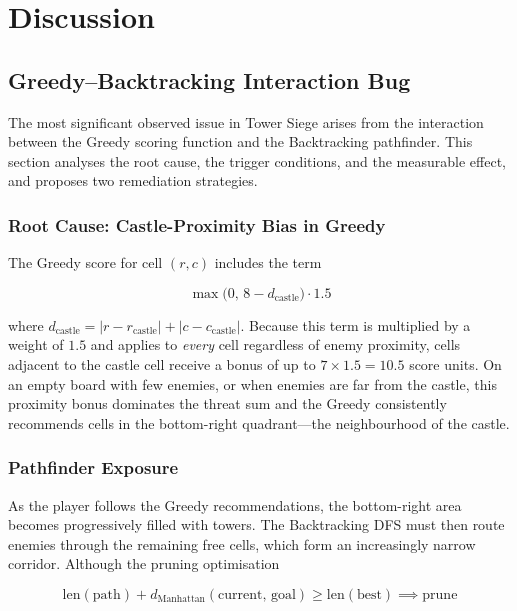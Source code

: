 \documentclass[12pt,a4paper]{report}
\begin{document}
\chapter{Discussion}
\label{ch:discussion}

\section{Greedy–Backtracking Interaction Bug}

The most significant observed issue in Tower Siege arises from the interaction
between the Greedy scoring function and the Backtracking pathfinder.
This section analyses the root cause, the trigger conditions, and the
measurable effect, and proposes two remediation strategies.

\subsection{Root Cause: Castle-Proximity Bias in Greedy}

The Greedy score for cell $(r, c)$ includes the term

\[
  \max\!\bigl(0,\,8 - d_\text{castle}\bigr) \cdot 1.5
\]

where $d_\text{castle} = |r - r_\text{castle}| + |c - c_\text{castle}|$.
Because this term is multiplied by a weight of $1.5$ and applies to
\textit{every} cell regardless of enemy proximity, cells adjacent to the
castle cell receive a bonus of up to $7 \times 1.5 = 10.5$ score units.
On an empty board with few enemies, or when enemies are far from the castle,
this proximity bonus dominates the threat sum and the Greedy consistently
recommends cells in the bottom-right quadrant---the neighbourhood of the
castle.

\subsection{Pathfinder Exposure}

As the player follows the Greedy recommendations, the bottom-right area
becomes progressively filled with towers.
The Backtracking DFS must then route enemies through the remaining free cells,
which form an increasingly narrow corridor.
Although the pruning optimisation

\[
  \text{len}(\text{path}) + d_\text{Manhattan}(\text{current, goal}) \ge \text{len}(\text{best})
  \implies \text{prune}
\]
\end{document}
